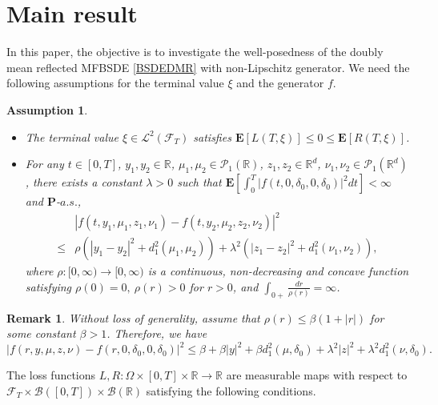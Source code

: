 \documentclass[10pt]{article}%
\numberwithin{equation}{section}
\newtheorem{remark}[theorem]{Remark}
\newtheorem{assumption}[theorem]{Assumption}
\begin{document}
\section{Main result}

In this paper, the objective is to investigate the well-posedness of the doubly mean reflected MFBSDE \eqref{BSDEDMR} with non-Lipschitz generator.  We need the following  assumptions for the terminal value $\xi$ and the generator $f$.  
\begin{assumption}\label{assf}
\begin{itemize}
\item[(i)] The terminal value $\xi\in\mathcal{L}^2(\mathcal{F}_T)$ satisfies $\mathbf{E}\left[L(T,\xi)\right]\leq 0\leq \mathbf{E}\left[R(T,\xi)\right]$.
\item[(ii)]  For any $t\in[0,T]$, $ y_1,y_2\in \mathbb{R}$, $\mu_1, \mu_2\in\mathcal{P}_{1}\left(\mathbb{R}\right)$,  $z_1,z_2\in \mathbb{R}^d$, $\nu_1,\nu_2\in\mathcal{P}_{1}\left(\mathbb{R}^d\right)$, there exists a constant $\lambda>0$ such that $\mathbf{E}\left[\int_{0}^{T}\left|f(t,0,\delta_0,0,\delta_0)\right|^2dt\right]<\infty$ and $\mathbf{P}$-$a.s.$, 
\begin{equation*}\begin{split}
 &\left|f(t,y_1,\mu_1,z_1,\nu_1)-f(t,y_2,\mu_2,z_2,\nu_2)\right|^2\\
 \leq& \rho\left(\left|y_1-y_2\right|^2+d_1^2\left(\mu_1,\mu_2\right)\right)+\lambda^2\left(\left|z_1-z_2\right|^2+d_1^2\left(\nu_1,\nu_2\right)\right),  
\end{split}  
\end{equation*}
where $\rho:[0,\infty) \rightarrow [0,\infty) $ is a continuous, non-decreasing and concave function satisfying $\rho(0)=0,\ \rho(r)>0$ for $r>0$, and $\int_{0+}\frac{dr}{\rho(r)}=\infty$.
\end{itemize}     
\end{assumption}
\begin{remark}\label{concave}
Without loss of generality, assume that $\rho(r)\leq \beta\left(1+\left|r\right|\right)$ for some constant $\beta>1$. Therefore, we have  $$\left|f(r,y,\mu,z,\nu)-f(r,0,\delta_{0},0,\delta_{0})\right|^2\leq \beta+\beta\left|y\right|^2+\beta d_1^2(\mu,\delta_0)+\lambda^2\left|z\right|^2+\lambda^2d_1^2\left(\nu,\delta_0\right).$$   
\end{remark}

The loss functions $L,R:\Omega\times [0,T]\times\mathbb{R}\rightarrow \mathbb{R}$ are measurable maps with respect to $\mathcal{F}_T\times \mathcal{B}([0,T])\times \mathcal{B}(\mathbb{R})$ satisfying the following conditions.
\end{document}

